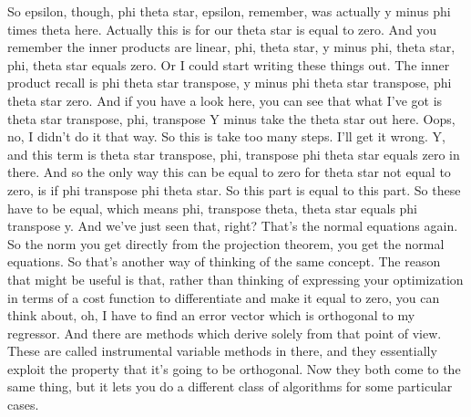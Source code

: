 \documentclass[11pt,a4paper]{article}
\begin{document}
So epsilon, though, phi theta star, epsilon, remember, was actually y minus phi times theta here. Actually this is for our theta star is equal to zero. And you remember the inner products are linear, phi, theta star, y minus phi, theta star, phi, theta star equals zero. Or I could start writing these things out. The inner product recall is phi theta star transpose, y minus phi theta star transpose, phi theta star zero. And if you have a look here, you can see that what I've got is theta star transpose, phi, transpose Y minus take the theta star out here. Oops, no, I didn't do it that way. So this is take too many steps. I'll get it wrong. Y, and this term is theta star transpose, phi, transpose phi theta star equals zero in there. And so the only way this can be equal to zero for theta star not equal to zero, is if phi transpose phi theta star. So this part is equal to this part. So these have to be equal, which means phi, transpose theta, theta star equals phi transpose y. And we've just seen that, right? That's the normal equations again. So the norm you get directly from the projection theorem, you get the normal equations. So that's another way of thinking of the same concept. The reason that might be useful is that, rather than thinking of expressing your optimization in terms of a cost function to differentiate and make it equal to zero, you can think about, oh, I have to find an error vector which is orthogonal to my regressor. And there are methods which derive solely from that point of view. These are called instrumental variable methods in there, and they essentially exploit the property that it's going to be orthogonal. Now they both come to the same thing, but it lets you do a different class of algorithms for some particular cases.
\end{document}
